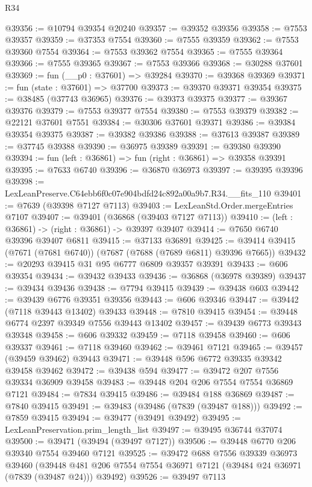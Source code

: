 \begin{lexlean}{R34}
\begin{coremodule}
@39356 := @10794 @39354 @20240
@39357 := @39352 @39356
@39358 := @7553 @39357
@39359 := @37353 @7554
@39360 := @7555 @39359
@39362 := @7553 @39360 @7554
@39364 := @7553 @39362 @7554
@39365 := @7555 @39364
@39366 := @7555 @39365
@39367 := @7553 @39366
@39368 := @30288 @37601
@39369 := fun (__p0 : @37601) => @39284
@39370 := @39368 @39369
@39371 := fun (state : @37601) => @37700
@39373 := @39370 @39371 @39354
@39375 := @38485 (@37743 @36965)
@39376 := @39373 @39375
@39377 := @39367 @39376
@39379 := @7553 @39377 @7554
@39380 := @7553 @39379
@39382 := @22121 @37601 @7551
@39384 := @30306 @37601 @39371
@39386 := @39384 @39354 @39375
@39387 := @39382 @39386
@39388 := @37613 @39387
@39389 := @37745 @39388
@39390 := @36975 @39389
@39391 := @39380 @39390
@39394 := fun (left : @36861) => fun (right : @36861) => @39358 @39391
@39395 := @7633 @6740
@39396 := @36870 @36973
@39397 := @39395 @39396
@39398 := LexLeanPreserve.C64ebb6f0c07e904bdfd24c892a00a9b7.R34.__fits_110
@39401 := @7639 (@39398 @7127 @7113)
@39403 := LexLeanStd.Order.mergeEntries @7107
@39407 := @39401 (@36868 (@39403 @7127 @7113))
@39410 := (left : @36861) -> (right : @36861) -> @39397 @39407
@39414 := @7650 @6740 @39396 @39407 @6811
@39415 := @37133 @36891
@39425 := @39414 @39415 (@7671 (@7681 @6740)) (@7687 (@7688 (@7689 @6811) @39396 @7665))
@39432 := @20293 @39415 @31 @95 @6777 @6809 @39357 @39391
@39433 := @606 @39354
@39434 := @39432 @39433
@39436 := @36868 (@36978 @39389)
@39437 := @39434 @39436
@39438 := @7794 @39415
@39439 := @39438 @603
@39442 := @39439 @6776 @39351 @39356
@39443 := @606 @39346
@39447 := @39442 (@7118 @39443 @13402) @39433
@39448 := @7810 @39415
@39454 := @39448 @6774 @2397 @39349 @7556 @39443 @13402
@39457 := @39439 @6773 @39343 @39348
@39458 := @606 @39332
@39459 := @7118 @39458
@39460 := @606 @39337
@39461 := @7118 @39460
@39462 := @39461 @7121
@39465 := @39457 (@39459 @39462) @39443
@39471 := @39448 @596 @6772 @39335 @39342 @39458 @39462
@39472 := @39438 @594
@39477 := @39472 @207 @7556 @39334 @36909 @39458
@39483 := @39448 @204 @206 @7554 @7554 @36869 @7121
@39484 := @7834 @39415
@39486 := @39484 @188 @36869
@39487 := @7840 @39415
@39491 := @39483 (@39486 (@7839 (@39487 @188)))
@39492 := @7859 @39415
@39494 := @39477 (@39491 @39492)
@39495 := LexLeanPreservation.prim_length_list
@39497 := @39495 @36744 @37074
@39500 := @39471 (@39494 (@39497 @7127))
@39506 := @39448 @6770 @206 @39340 @7554 @39460 @7121
@39525 := @39472
    @688
    @7556
    @39339
    @36973
    @39460
    (@39448 @481 @206 @7554 @7554 @36971 @7121 (@39484 @24 @36971 (@7839 (@39487 @24))) @39492)
@39526 := @39497 @7113

\end{coremodule}
\end{lexlean}
